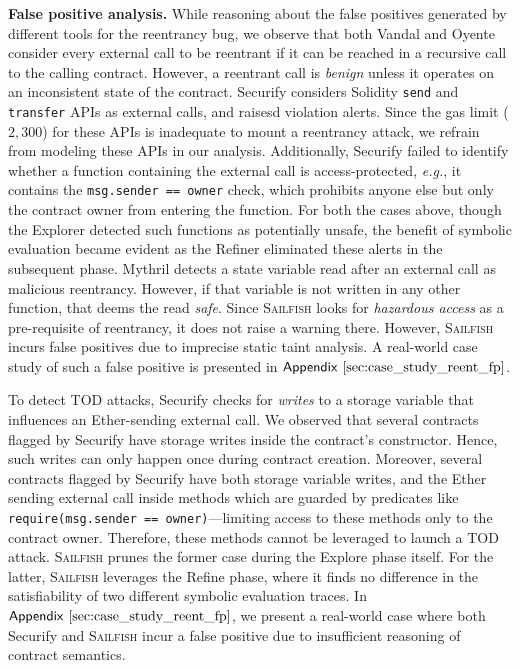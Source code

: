 \documentclass[conference, romanappendices]{tex/IEEEtran}
\theoremstyle{bfnote}
\newcommand{\toolname}{\textsc{Sailfish}\xspace}
\newcommand{\oyente}{{\sc Oyente}\xspace}
\newcommand{\explore}{{\sc Explore}\xspace}
\newcommand{\explorer}{{\sc Explorer}\xspace}
\newcommand{\refine}{{\sc Refine}\xspace}
\newcommand{\refiner}{{\sc Refiner}\xspace}
\newcommand{\securify}{{\sc Securify}\xspace}
\newcommand{\vandal}{{\sc Vandal}\xspace}
\newcommand{\solidity}{{\sc Solidity}\xspace}
\newcommand{\ether}{{Ether}\xspace}
\newcommand{\reentrancy}{{reentrancy}\xspace}
\newcommand{\mythril}{{\sc Mythril}\xspace}
\newcommand{\eg}{\textit{e.g.}}
\newcommand{\Appen}[1]{\ensuremath{\sf Appendix~\ref{#1}}}
\begin{document}
\noindent
\textbf{False positive analysis.}
While reasoning about the false positives generated by different tools for the \reentrancy bug, we observe that both \vandal{} and \oyente consider every external call to be reentrant if it can be reached in a recursive call to the calling contract.
However, a reentrant call is \textit{benign} unless it operates on an inconsistent state of the contract.
\securify{} considers \solidity{} \texttt{send} and \texttt{transfer} APIs as external calls, and raisesd violation alerts.
Since the gas limit ($2,300$) for these APIs is inadequate to mount a \reentrancy attack, we refrain from modeling these APIs in our analysis.
Additionally, \securify{} failed to identify whether a function containing the external call is access-protected, \eg, it contains the \texttt{msg.sender == owner} check, which prohibits anyone else but only the contract owner from entering the function.
For both the cases above, though the \explorer detected such functions as potentially unsafe, the benefit of symbolic evaluation became evident as the \refiner{} eliminated these alerts in the subsequent phase.
\mythril{} detects a state variable read after an external call as malicious \reentrancy.
However, if that variable is not written in any other function, that deems the read \textit{safe}.
Since \toolname{} looks for \textit{hazardous access} as a pre-requisite of \reentrancy, it does not raise a warning there.
However, \toolname{} incurs false positives due to imprecise static taint analysis.
A real-world case study of such a false positive is presented in \Appen{sec:case_study_reent_fp}.

To detect TOD attacks, \securify checks for \emph{writes} to a storage variable that influences an \ether-sending external call.
We observed that several contracts flagged by \securify have storage writes inside the contract's constructor.
Hence, such writes can only happen once during contract creation.
Moreover, several contracts flagged by \securify have both storage variable writes, and the \ether sending external call inside methods which are guarded by predicates like \texttt{require(msg.sender == owner)}---limiting access to these methods only to the contract owner.
Therefore, these methods cannot be leveraged to launch a TOD attack.
\toolname prunes the former case during the \explore phase itself.
For the latter, \toolname leverages the \refine phase, where it finds no difference in the satisfiability of two different symbolic evaluation traces.
In \Appen{sec:case_study_reent_fp}, we present a real-world case  where both \securify and \toolname incur a false positive due to insufficient reasoning of contract semantics.
\end{document}
